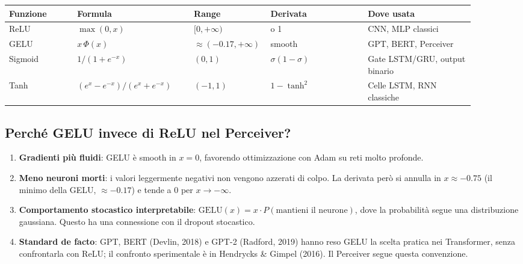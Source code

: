 \documentclass[
  11pt,
]{article}
\newcounter{none} %
\begin{document}
{\def\LTcaptype{none}
\begin{longtable}{@{}
  >{\raggedright\arraybackslash}p{0.14\linewidth}
  >{\raggedright\arraybackslash}p{0.24\linewidth}
  >{\centering\arraybackslash}p{0.10\linewidth}
  >{\raggedright\arraybackslash}p{0.20\linewidth}
  >{\raggedright\arraybackslash}p{0.22\linewidth}@{}}
\toprule
\textbf{Funzione} & \textbf{Formula} & \textbf{Range} & \textbf{Derivata} & \textbf{Dove usata} \\
\midrule\endhead
\bottomrule\endlastfoot
ReLU & $\max(0,x)$ & $[0, +\infty)$ & 0 o 1 & CNN, MLP classici \\
GELU & $x\,\Phi(x)$ & $\approx(-0.17, +\infty)$ & smooth & GPT, BERT, Perceiver \\
Sigmoid & $1/(1+e^{-x})$ & $(0,1)$ & $\sigma(1-\sigma)$ & Gate LSTM/GRU, output binario \\
Tanh & $(e^x-e^{-x})/(e^x+e^{-x})$ & $(-1,1)$ & $1-\tanh^2$ & Celle LSTM, RNN classiche \\
\end{longtable}
}

\subsection{Perché GELU invece di ReLU nel Perceiver?}

\begin{notabox}[title={\textbf{GELU vs ReLU nelle architetture basate su attenzione}}]
\begin{enumerate}
  \item \textbf{Gradienti più fluidi}: GELU è smooth in $x=0$, favorendo ottimizzazione con Adam su reti molto profonde.
  \item \textbf{Meno neuroni morti}: i valori leggermente negativi non vengono azzerati di colpo. La derivata però si annulla in $x \approx -0.75$ (il minimo della GELU, $\approx -0.17$) e tende a 0 per $x \to -\infty$.
  \item \textbf{Comportamento stocastico interpretabile}: $\text{GELU}(x) = x \cdot P(\text{mantieni il neurone})$, dove la probabilità segue una distribuzione gaussiana. Questo ha una connessione con il dropout stocastico.
  \item \textbf{Standard de facto}: GPT, BERT (Devlin, 2018) e GPT-2 (Radford, 2019) hanno reso GELU la scelta pratica nei Transformer, senza confrontarla con ReLU; il confronto sperimentale è in Hendrycks \& Gimpel (2016). Il Perceiver segue questa convenzione.
\end{enumerate}
\end{notabox}
\end{document}
